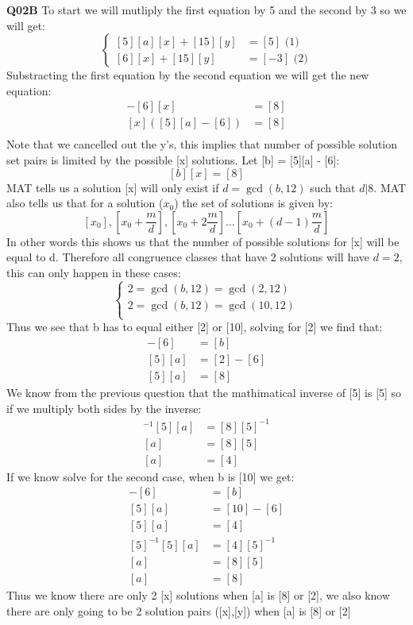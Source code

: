 \documentclass[11pt]{article}
\begin{document}
\textbf{Q02B} To start we will mutliply the first equation by 5 and the second by 3 so we will get:
$$
\begin{cases}
[5][a][x] + [15][y] & = [5]  \text{      (1)}\\
[6][x] + [15][y] & = [-3]    \text{      (2)}
\end{cases}
$$
Substracting the first equation by the second equation we will get the new equation:
\begin{align*}
 [5][a][x] - [6][x] & = [8] \\
 [x]([5][a] - [6]) & = [8] \\
\end{align*}
Note that we cancelled out the y's, this implies that number of possible solution set pairs is limited by the possible [x] solutions. Let [b] = [5][a] - [6]:
\[ [b][x] = [8] \]
MAT tells us a solution [x] will only exist if $d = \gcd(b,12)$ such that $d|8$. MAT also tells us that for a solution ($x_0$) the set of solutions is given by:
\[  [x_0], [x_0 + \frac{m}{d}], [x_0 + 2\frac{m}{d}]...[x_0 + (d-1)\frac{m}{d}]  \]
In other words this shows us that the number of possible solutions for [x] will be equal to d. Therefore all congruence classes that have 2 solutions will have $d = 2$, this can only happen in these cases:
$$
\begin{cases}
2 = \gcd(b, 12) = \gcd(2,12)\\
2 = \gcd(b, 12) = \gcd(10,12)\\
\end{cases}
$$
Thus we see that b has to equal either [2] or [10], solving for [2] we find that:
\begin{align*}
 [5][a] - [6]  & = [b] \\
          [5][a] & = [2]  - [6] \\
          [5][a]  & = [8] 
\end{align*}
We know from the previous question that the mathimatical inverse of [5] is [5] so if we multiply both sides by the inverse:
\begin{align*}
          [5]^{-1}[5][a]  & = [8][5]^{-1} \\
          [a]  & = [8][5] \\
          [a]  & = [4] 
\end{align*}
If we know solve for the second case, when b is [10] we get:
\begin{align*}
 [5][a] - [6]  & = [b] \\
          [5][a] & = [10]  - [6] \\
          [5][a]  & = [4]  \\
          [5]^{-1}[5][a]  & = [4][5]^{-1} \\
          [a]  & = [8][5] \\
          [a]  & = [8]
\end{align*}
Thus we know there are only 2 [x] solutions when [a] is [8] or [2], we also know there are only going to be 2 solution pairs ([x],[y]) when [a] is [8] or [2]
\end{document}
